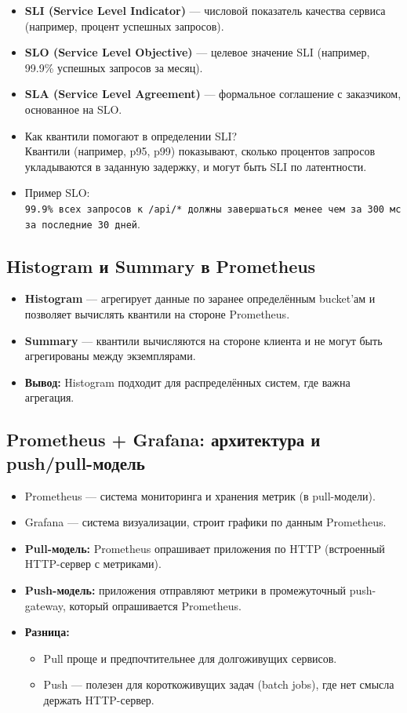 \documentclass[a4paper,14pt]{article}
\begin{document}
\begin{itemize}
\item \textbf{SLI (Service Level Indicator)} — числовой показатель качества сервиса (например, процент успешных запросов).
\item \textbf{SLO (Service Level Objective)} — целевое значение SLI (например, 99.9\% успешных запросов за месяц).
\item \textbf{SLA (Service Level Agreement)} — формальное соглашение с заказчиком, основанное на SLO.

\item Как квантили помогают в определении SLI? \\
Квантили (например, p95, p99) показывают, сколько процентов запросов укладываются в заданную задержку, и могут быть SLI по латентности.

\item Пример SLO: \\
\texttt{99.9\% всех запросов к /api/* должны завершаться менее чем за 300 мс за последние 30 дней}.
\end{itemize}

\subsection{Histogram и Summary в Prometheus}

\begin{itemize}
\item \textbf{Histogram} — агрегирует данные по заранее определённым bucket'ам и позволяет вычислять квантили на стороне Prometheus.
\item \textbf{Summary} — квантили вычисляются на стороне клиента и не могут быть агрегированы между экземплярами.
\item \textbf{Вывод:} Histogram подходит для распределённых систем, где важна агрегация.
\end{itemize}

\subsection{Prometheus + Grafana: архитектура и push/pull-модель}

\begin{itemize}
\item Prometheus — система мониторинга и хранения метрик (в pull-модели).
\item Grafana — система визуализации, строит графики по данным Prometheus.
\item \textbf{Pull-модель:} Prometheus опрашивает приложения по HTTP (встроенный HTTP-сервер с метриками).
\item \textbf{Push-модель:} приложения отправляют метрики в промежуточный push-gateway, который опрашивается Prometheus.

\item \textbf{Разница:} 
\begin{itemize}
  \item Pull проще и предпочтительнее для долгоживущих сервисов.
  \item Push — полезен для короткоживущих задач (batch jobs), где нет смысла держать HTTP-сервер.
\end{itemize}
\end{itemize}
\end{document}
